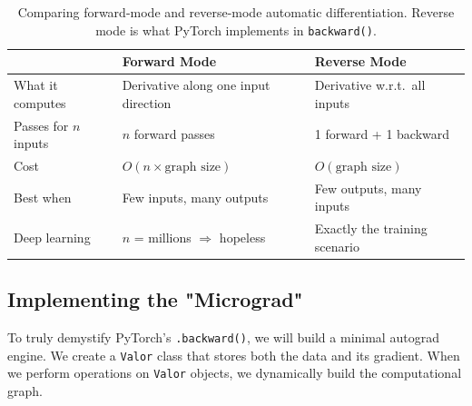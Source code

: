 \documentclass{tufte-handout}
\begin{document}
\begin{table}[htbp]
\centering
\small
\begin{tabularx}{\textwidth}{@{}>{\raggedright\arraybackslash}p{3.0cm}X X@{}}
\toprule
 & \textbf{Forward Mode} & \textbf{Reverse Mode} \\
\midrule
What it computes & Derivative along one input direction & Derivative w.r.t.\ all inputs \\
Passes for $n$ inputs & $n$ forward passes & 1 forward + 1 backward \\
Cost & $O(n \times \text{graph size})$ & $O(\text{graph size})$ \\
Best when & Few inputs, many outputs & Few outputs, many inputs \\
Deep learning & $n$ = millions $\Rightarrow$ hopeless & Exactly the training scenario \\
\bottomrule
\end{tabularx}
\caption{Comparing forward-mode and reverse-mode automatic differentiation. Reverse mode is what PyTorch implements in \texttt{backward()}.}
\label{tab:fwd_vs_rev}
\end{table}

\subsection{Implementing the "Micrograd"}

To truly demystify PyTorch's \texttt{.backward()}, we will build a minimal autograd engine. We create a \texttt{Valor} class that stores both the data and its gradient. When we perform operations on \texttt{Valor} objects, we dynamically build the computational graph.
\end{document}
